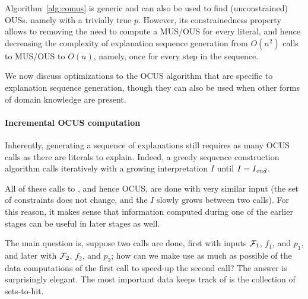 Algorithm~\ref{alg:comus} is generic and can also be used to find (unconstrained) OUSs. namely with a trivially true $p$. %
However, its constrainedness property allows to removing the need to compute a MUS/OUS for every literal, and hence decreasing the complexity of explanation sequence generation from $O(n^2)$ calls to MUS/OUS to $O(n)$, namely, once for every step in the sequence.

We now discuss optimizations to the OCUS algorithm that are specific to explanation sequence generation, though they can also be used when other forms of domain knowledge are present. 
 
\paragraph{Incremental OCUS computation}
Inherently, generating a sequence of explanations still requires as many OCUS calls as there are literals to explain. 
Indeed, a greedy sequence construction algorithm %
calls \onestepo iteratively with a growing interpretation $I$ until $I=I_\mathit{end} $.

All of these calls to \onestepo, and hence OCUS, are done with very similar input (the set of constraints does not change, and the $I$ slowly grows between two calls). For this reason, it makes sense that information computed during one of the earlier stages can be useful in later stages as well. 

The main question is, suppose two \comus calls are done, first with inputs $\mathcal{F} _1$, $f_1$, and $p_1$, and later with $\mathcal{F} _2$, $f_2$, and $p_2$; how can we make use as much as possible of the data computations of the first call to speed-up the second call? The answer is surprisingly elegant. The most important data \comus keeps track of  is the collection \setstohit of sets-to-hit.

